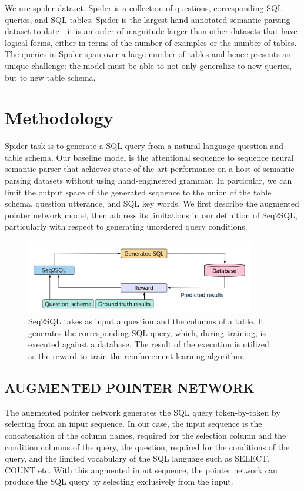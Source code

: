 \documentclass{article}
\begin{document}
We use spider dataset. Spider is a collection of questions, corresponding SQL queries, and SQL tables. Spider is the largest hand-annotated semantic parsing dataset to date - it is an order of magnitude larger than other datasets that have logical forms, either in terms of the number of examples or the number of tables. The queries in Spider span over a large number of tables and hence presents an unique challenge: the model must be able to not only generalize to new queries, but to new table schema.

\section{Methodology}
Spider task is to generate a SQL query from a natural language question and table schema.
Our baseline model is the attentional sequence to sequence neural semantic parser that achieves state-of-the-art performance on a host of semantic parsing datasets
without using hand-engineered grammar. In particular, we can limit the output space of the generated
sequence to the union of the table schema, question utterance, and SQL key words. We first describe
the augmented pointer network model, then address its limitations in our definition of Seq2SQL,
particularly with respect to generating unordered query conditions.

\clearpage

\begin{figure}[htp]
    \centering
    \includegraphics[width=10cm]{Seq2SQL Fig 1}
    \caption{ Seq2SQL takes as input a question and the columns of a table. It generates the corresponding SQL query, which, during training, is executed against a database. The result of the
execution is utilized as the reward to train the reinforcement learning algorithm.}
    \label{fig:galaxy}
\end{figure}


\subsection{AUGMENTED POINTER NETWORK}
The augmented pointer network generates the SQL query token-by-token by selecting from an input
sequence. In our case, the input sequence is the concatenation of the column names, required for the
selection column and the condition columns of the query, the question, required for the conditions
of the query, and the limited vocabulary of the SQL language such as SELECT, COUNT etc. With this augmented input sequence, the pointer network
can produce the SQL query by selecting exclusively from the input.
\end{document}
